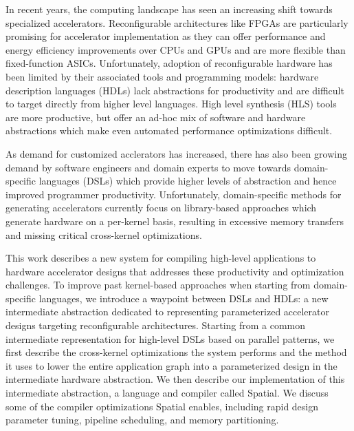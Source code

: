 In recent years, the computing landscape has seen an increasing shift towards
specialized accelerators. Reconfigurable architectures like FPGAs are
particularly promising for accelerator implementation as they can offer
performance and energy efficiency improvements over CPUs and GPUs and are more
flexible than fixed-function ASICs. Unfortunately, adoption of reconfigurable
hardware has been limited by their associated tools and programming models:
hardware description languages (HDLs) lack abstractions for productivity and are
difficult to target directly from higher level languages. High level synthesis
(HLS) tools are more productive, but offer an ad-hoc mix of software and
hardware abstractions which make even automated performance optimizations
difficult.

As demand for customized acclerators has increased, there has also been growing
demand by software engineers and domain experts to move towards domain-specific
languages (DSLs) which provide higher levels of abstraction and hence improved
programmer productivity.
Unfortunately, domain-specific methods for generating accelerators currently
focus on library-based approaches which generate
hardware on a per-kernel basis, resulting in excessive memory transfers and
missing critical cross-kernel optimizations.

This work describes a new system for compiling high-level applications to
hardware accelerator designs that addresses these productivity and optimization
challenges. To improve past kernel-based
approaches when starting from domain-specific languages, we
introduce a waypoint between DSLs and HDLs: a new intermediate abstraction
dedicated to representing parameterized accelerator designs
targeting reconfigurable architectures.
Starting from a common intermediate
representation for high-level DSLs based on parallel patterns, we first describe
the cross-kernel optimizations the system performs and the method it uses to
lower the entire application graph into a parameterized design in the
intermediate hardware abstraction.
We then describe our implementation of
this intermediate abstraction, a language and compiler called Spatial.
We discuss some of the compiler optimizations Spatial enables,
including rapid design parameter tuning, pipeline scheduling, and
memory partitioning.

